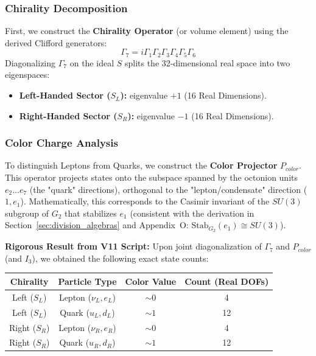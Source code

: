 \subsubsection{Chirality Decomposition}
First, we construct the \textbf{Chirality Operator} (or volume element) using the derived Clifford generators:
\begin{equation}
    \Gamma_7 = i \Gamma_1 \Gamma_2 \Gamma_3 \Gamma_4 \Gamma_5 \Gamma_6
\end{equation}
Diagonalizing $\Gamma_7$ on the ideal $S$ splits the 32-dimensional real space into two eigenspaces:
\begin{itemize}
    \item \textbf{Left-Handed Sector ($S_L$):} eigenvalue $+1$ (16 Real Dimensions).
    \item \textbf{Right-Handed Sector ($S_R$):} eigenvalue $-1$ (16 Real Dimensions).
\end{itemize}

\subsubsection{Color Charge Analysis}
To distinguish Leptons from Quarks, we construct the \textbf{Color Projector} $P_{color}$. This operator projects states onto the subspace spanned by the octonion units $e_2 \dots e_7$ (the "quark" directions), orthogonal to the "lepton/condensate" direction ($1, e_1$).
Mathematically, this corresponds to the Casimir invariant of the $SU(3)$ subgroup of $G_2$ that stabilizes $e_1$ (consistent with the derivation in Section~\ref{sec:division_algebras} and Appendix~O: $\mathrm{Stab}_{G_2}(e_1) \cong SU(3)$).

\textbf{Rigorous Result from V11 Script:}
Upon joint diagonalization of $\Gamma_7$ and $P_{color}$ (and $I_3$), we obtained the following exact state counts:

\begin{center}
\begin{tabular}{|c|c|c|c|}
\hline
\textbf{Chirality} & \textbf{Particle Type} & \textbf{Color Value} & \textbf{Count (Real DOFs)} \\
\hline
Left ($S_L$) & Lepton ($\nu_L, e_L$) & $\sim 0$ & 4 \\
Left ($S_L$) & Quark ($u_L, d_L$) & $\sim 1$ & 12 \\
Right ($S_R$) & Lepton ($\nu_R, e_R$) & $\sim 0$ & 4 \\
Right ($S_R$) & Quark ($u_R, d_R$) & $\sim 1$ & 12 \\
\hline
\end{tabular}
\end{center}

